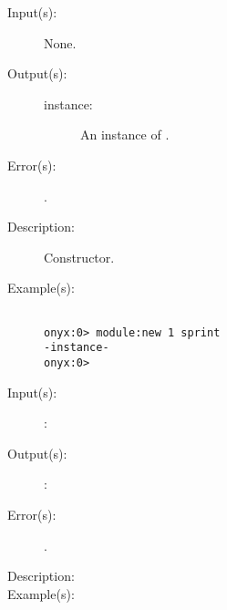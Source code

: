 \begin{description}
\label{module:new}
\item[{\onyxop{--}{new}{instance}}: ]
	\begin{description}\item[]
	\item[Input(s): ] None.
	\item[Output(s): ]
		\begin{description}\item[]
		\item[instance: ]
			An instance of .
		\end{description}
	\item[Error(s): ]
		\begin{description}\item[]
		\item[.]
		\end{description}
	\item[Description: ]
		Constructor.
	\item[Example(s): ]\begin{verbatim}

onyx:0> module:new 1 sprint
-instance-
onyx:0>
		\end{verbatim}
	\end{description}
\label{module:XXX}
\item[{\onyxop{METHODINS}{XXX}{METHODOUTS}}: ]
	\begin{description}\item[]
	\item[Input(s): ]
		\begin{description}\item[]
		\item[: ]
		\end{description}
	\item[Output(s): ]
		\begin{description}\item[]
		\item[: ]
		\end{description}
	\item[Error(s): ]
		\begin{description}\item[]
		\item[.]
		\end{description}
	\item[Description: ]
	\item[Example(s): ]\begin{verbatim}

		\end{verbatim}
	\end{description}
\end{description}
